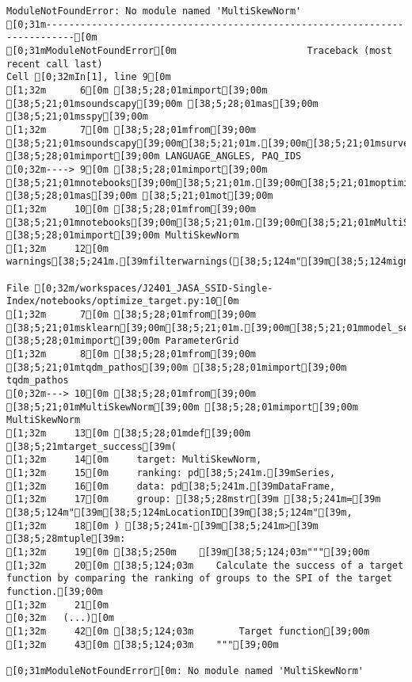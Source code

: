 \documentclass[
  letterpaper,
  DIV=11,
  numbers=noendperiod]{scrartcl}
\begin{document}
\begin{verbatim}
ModuleNotFoundError: No module named 'MultiSkewNorm'
[0;31m---------------------------------------------------------------------------[0m
[0;31mModuleNotFoundError[0m                       Traceback (most recent call last)
Cell [0;32mIn[1], line 9[0m
[1;32m      6[0m [38;5;28;01mimport[39;00m [38;5;21;01msoundscapy[39;00m [38;5;28;01mas[39;00m [38;5;21;01msspy[39;00m
[1;32m      7[0m [38;5;28;01mfrom[39;00m [38;5;21;01msoundscapy[39;00m[38;5;21;01m.[39;00m[38;5;21;01msurveys[39;00m[38;5;21;01m.[39;00m[38;5;21;01msurvey_utils[39;00m [38;5;28;01mimport[39;00m LANGUAGE_ANGLES, PAQ_IDS
[0;32m----> 9[0m [38;5;28;01mimport[39;00m [38;5;21;01mnotebooks[39;00m[38;5;21;01m.[39;00m[38;5;21;01moptimize_target[39;00m [38;5;28;01mas[39;00m [38;5;21;01mot[39;00m
[1;32m     10[0m [38;5;28;01mfrom[39;00m [38;5;21;01mnotebooks[39;00m[38;5;21;01m.[39;00m[38;5;21;01mMultiSkewNorm[39;00m [38;5;28;01mimport[39;00m MultiSkewNorm
[1;32m     12[0m warnings[38;5;241m.[39mfilterwarnings([38;5;124m"[39m[38;5;124mignore[39m[38;5;124m"[39m)

File [0;32m/workspaces/J2401_JASA_SSID-Single-Index/notebooks/optimize_target.py:10[0m
[1;32m      7[0m [38;5;28;01mfrom[39;00m [38;5;21;01msklearn[39;00m[38;5;21;01m.[39;00m[38;5;21;01mmodel_selection[39;00m [38;5;28;01mimport[39;00m ParameterGrid
[1;32m      8[0m [38;5;28;01mfrom[39;00m [38;5;21;01mtqdm_pathos[39;00m [38;5;28;01mimport[39;00m tqdm_pathos
[0;32m---> 10[0m [38;5;28;01mfrom[39;00m [38;5;21;01mMultiSkewNorm[39;00m [38;5;28;01mimport[39;00m MultiSkewNorm
[1;32m     13[0m [38;5;28;01mdef[39;00m [38;5;21mtarget_success[39m(
[1;32m     14[0m     target: MultiSkewNorm,
[1;32m     15[0m     ranking: pd[38;5;241m.[39mSeries,
[1;32m     16[0m     data: pd[38;5;241m.[39mDataFrame,
[1;32m     17[0m     group: [38;5;28mstr[39m [38;5;241m=[39m [38;5;124m"[39m[38;5;124mLocationID[39m[38;5;124m"[39m,
[1;32m     18[0m ) [38;5;241m-[39m[38;5;241m>[39m [38;5;28mtuple[39m:
[1;32m     19[0m [38;5;250m    [39m[38;5;124;03m"""[39;00m
[1;32m     20[0m [38;5;124;03m    Calculate the success of a target function by comparing the ranking of groups to the SPI of the target function.[39;00m
[1;32m     21[0m 
[0;32m   (...)[0m
[1;32m     42[0m [38;5;124;03m        Target function[39;00m
[1;32m     43[0m [38;5;124;03m    """[39;00m

[0;31mModuleNotFoundError[0m: No module named 'MultiSkewNorm'
\end{verbatim}
\end{document}
